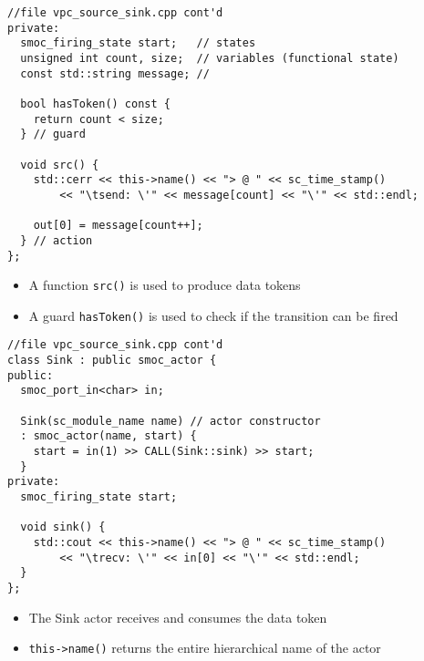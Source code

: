 \begin{frame}[fragile=singleslide]
\begin{lstlisting}
//file vpc_source_sink.cpp cont'd
private:
  smoc_firing_state start;   // states
  unsigned int count, size;  // variables (functional state)
  const std::string message; //

  bool hasToken() const {
    return count < size;
  } // guard

  void src() {
    std::cerr << this->name() << "> @ " << sc_time_stamp()
        << "\tsend: \'" << message[count] << "\'" << std::endl;

    out[0] = message[count++];
  } // action
};
\end{lstlisting}
\begin{itemize}
\item A function \lstinline!src()! is used to produce data tokens
\item A guard \lstinline!hasToken()! is used to check if the transition can be fired
\end{itemize}
\end{frame}


\begin{frame}[fragile=singleslide]
\begin{lstlisting}
//file vpc_source_sink.cpp cont'd
class Sink : public smoc_actor {
public:
  smoc_port_in<char> in;

  Sink(sc_module_name name) // actor constructor
  : smoc_actor(name, start) {
    start = in(1) >> CALL(Sink::sink) >> start;
  }
private:
  smoc_firing_state start;

  void sink() {
    std::cout << this->name() << "> @ " << sc_time_stamp()
        << "\trecv: \'" << in[0] << "\'" << std::endl;
  }
};
\end{lstlisting}
\begin{itemize}
\item The Sink actor receives and consumes the data token
\item \lstinline!this->name()! returns the entire hierarchical name of the actor
\end{itemize}
\end{frame}


